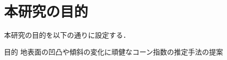 \documentclass[../main]{subfiles}
\begin{document}
\graphicspath{{../figures/chap1/}}

\section{本研究の目的}
\label{sec:intro_my_purpose}
本研究の目的を以下の通りに設定する．

\bigskip
\begin{itembox}[c]{目的}
  \centering
  地表面の凹凸や傾斜の変化に頑健なコーン指数の推定手法の提案
\end{itembox}
\end{document}
